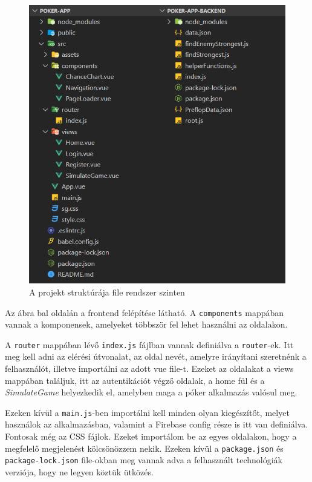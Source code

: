 \begin{figure}[h]
	\centering
	\includegraphics[scale=0.85]{images/frontend-backend-arch.png}
	\caption{A projekt struktúrája file rendszer szinten}
	\label{fig:frontend-backend-arch}
\end{figure}

Az ábra bal oldalán a frontend felépítése látható. A \texttt{components} mappában vannak a komponensek, amelyeket többször fel lehet használni az oldalakon. 

A \texttt{router} mappában lévő \texttt{index.js} fájlban vannak definiálva a \texttt{router}-ek. Itt meg kell adni az elérési útvonalat, az oldal nevét, amelyre irányítani szeretnénk a felhasználót, illetve importálni az adott vue file-t. Ezeket az oldalakat a views mappában találjuk, itt az autentikációt végző oldalak, a home fül és a \textit{SimulateGame} helyezkedik el, amelyben maga a póker alkalmazás valósul meg.

Ezeken kívül a \texttt{main.js}-ben importálni kell minden olyan kiegészítőt, melyet használok az alkalmazásban, valamint a Firebase config része is itt van definiálva. Fontosak még az CSS fájlok. Ezeket importálom be az egyes oldalakon, hogy a megfelelő megjelenést kölcsönözzem nekik. Ezeken kívül a \texttt{package.json} és \texttt{package-lock.json} file-okban meg vannak adva a felhasznált technológiák verziója, hogy ne legyen köztük ütközés.

